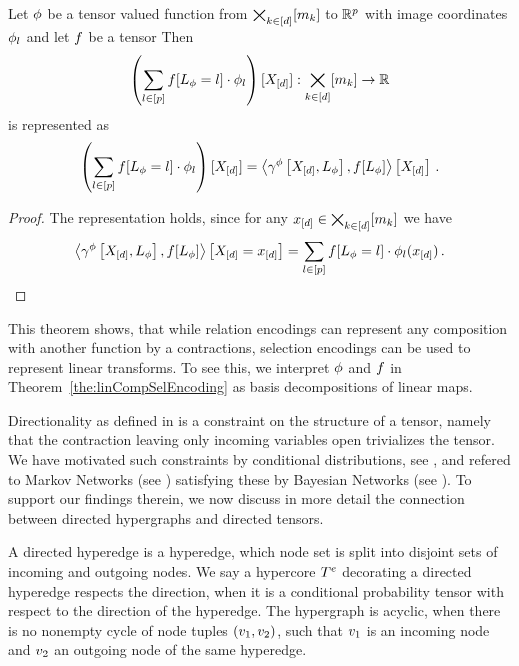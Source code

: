 \begin{theorem}
    \label{the:linCompSelEncoding}
    Let $\phi$ be a tensor valued function from $\bigtimes_{k\in[d]}[m_{k}]$ to $\mathbb{R}^{p}$ with image coordinates $\phi_l$ and let $f$ be a tensor
    Then
    \[ \left(\sum_{l\in[p]}f[L_{\phi}=l]\cdot \phi_l \right) [X_{[d]}] : \bigtimes_{k\in[d]}[m_{k}] \rightarrow \mathbb{R} \]
    is represented as
    \[ \left(\sum_{l\in[p]}f[L_{\phi}=l]\cdot \phi_l \right) [X_{[d]}]
    = \left\langle \gamma^{\phi}\left[X_{[d]},L_{\phi}\right] , f[L_{\phi}]\right\rangle \left[ X_{[d]} \right] \, . \]
\end{theorem}
\begin{proof}
    The representation holds, since for any $x_{[d]}\in\bigtimes_{k\in[d]}[m_{k}]$ we have
    \begin{align*}
        \left\langle \gamma^{\phi}\left[X_{[d]},L_{\phi}\right] , f[L_{\phi}]\right\rangle \left[ X_{[d]}=x_{[d]} \right]
        = \sum_{l\in[p]}f[L_{\phi}=l]\cdot\phi_l(x_{[d]}) \, .
    \end{align*}
\end{proof}

This theorem shows, that while relation encodings can represent any composition with another function by a contractions, selection encodings can be used to represent linear transforms.
To see this, we interpret $\phi$ and $f$ in Theorem~\ref{the:linCompSelEncoding} as basis decompositions of linear maps.


Directionality as defined in  is a constraint on the structure of a tensor, namely that the contraction leaving only incoming variables open trivializes the tensor.
We have motivated such constraints by conditional distributions, see , and refered to Markov Networks (see ) satisfying these by Bayesian Networks (see ).
To support our findings therein, we now discuss in more detail the connection between directed hypergraphs and directed tensors.

\begin{definition}
    A directed hyperedge is a hyperedge, which node set is split into disjoint sets of incoming and outgoing nodes.
    We say a hypercore $T^{e}$ decorating a directed hyperedge respects the direction, when it is a conditional probability tensor with respect to the direction of the hyperedge.
    The hypergraph is acyclic, when there is no nonempty cycle of node tuples $(v_1,v_2)$, such that $v_1$ is an incoming node and $v_2$ an outgoing node of the same hyperedge.
\end{definition}


